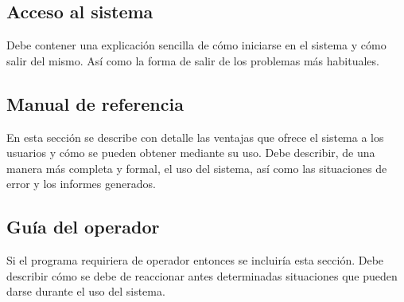 \subsection{Acceso al sistema}

Debe contener una explicación sencilla de cómo iniciarse en el sistema y cómo salir del mismo. Así como la forma de salir de los problemas más habituales.  


\subsection{Manual de referencia}

En esta sección se describe con detalle las ventajas que ofrece el sistema a los usuarios y cómo se pueden obtener mediante su uso. Debe describir, de una manera más completa y formal, el uso del sistema, así como las situaciones de error y los informes generados.  


\subsection{Guía del operador}

Si el programa requiriera de operador entonces se incluiría esta sección. Debe describir cómo se debe de reaccionar antes determinadas situaciones que pueden darse durante el uso del sistema.  

